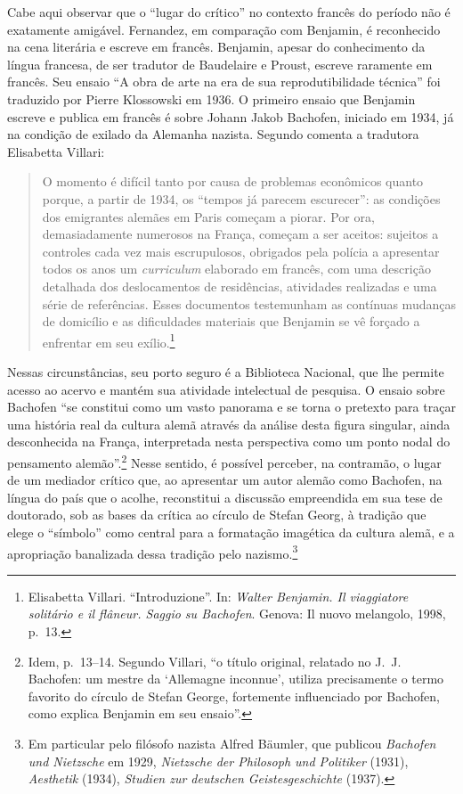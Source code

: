 Cabe aqui observar que o ``lugar do crítico'' no contexto francês do
período não é exatamente amigável. Fernandez, em comparação com
Benjamin, é reconhecido na cena literária e escreve em francês.
Benjamin, apesar do conhecimento da língua francesa, de ser tradutor de
Baudelaire e Proust, escreve raramente em francês. Seu ensaio ``A obra
de arte na era de sua reprodutibilidade técnica'' foi traduzido por
Pierre Klossowski em 1936. O primeiro ensaio que Benjamin escreve e
publica em francês é sobre Johann Jakob Bachofen, iniciado em 1934, já na
condição de exilado da Alemanha nazista. Segundo comenta a tradutora
Elisabetta Villari:

\begin{quote}
O momento é difícil tanto por causa de problemas econômicos quanto
porque, a partir de 1934, os ``tempos já parecem escurecer'': as
condições dos emigrantes alemães em Paris começam a piorar. Por ora,
demasiadamente numerosos na França, começam a ser aceitos: sujeitos a
controles cada vez mais escrupulosos, obrigados pela polícia a
apresentar todos os anos um \emph{curriculum} elaborado em francês, com
uma descrição detalhada dos deslocamentos de residências, atividades
realizadas e uma série de referências. Esses documentos testemunham as
contínuas mudanças de domicílio e as dificuldades materiais que Benjamin
se vê forçado a enfrentar em seu exílio.\footnote{Elisabetta Villari. ``Introduzione''. 
  In: \emph{Walter Benjamin. Il viaggiatore solitário e il flâneur.
  Saggio su Bachofen}. Genova: Il nuovo melangolo, 1998, p.~13.}
\end{quote}

Nessas circunstâncias, seu porto seguro é a Biblioteca Nacional, que lhe
permite acesso ao acervo e mantém sua atividade intelectual de pesquisa.
O ensaio sobre Bachofen ``se constitui como um vasto panorama e se torna
o pretexto para traçar uma história real da cultura alemã através da
análise desta figura singular, ainda desconhecida na França,
interpretada nesta perspectiva como um ponto nodal do pensamento
alemão''.\footnote{Idem, p.~13--14. Segundo Villari, ``o título original,
  relatado no J.~J. Bachofen: um mestre da `Allemagne inconnue', utiliza
  precisamente o termo favorito do círculo de Stefan George, fortemente
  influenciado por Bachofen, como explica Benjamin em seu ensaio''.}
Nesse sentido, é possível perceber, na contramão, o lugar de um mediador
crítico que, ao apresentar um autor alemão como Bachofen, na língua do
país que o acolhe, reconstitui a discussão empreendida em sua tese de
doutorado, sob as bases da crítica ao círculo de Stefan Georg, à
tradição que elege o ``símbolo'' como central para a formatação
imagética da cultura alemã, e a apropriação banalizada dessa tradição
pelo nazismo.\footnote{Em particular pelo filósofo nazista Alfred
  Bäumler, que publicou \emph{Bachofen und Nietzsche} em 1929,
  \emph{Nietzsche der Philosoph und Politiker} (1931), \emph{Aesthetik}
  (1934), \emph{Studien zur deutschen Geistesgeschichte} (1937).}

